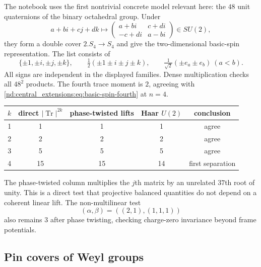 \documentclass[10pt]{article}
\newcommand{\Tr}{\operatorname{Tr}}
\begin{document}
The notebook uses the first nontrivial concrete model relevant here:
the $48$ unit quaternions of the binary octahedral group.  Under
\[
 a+bi+cj+dk\longmapsto
 \begin{pmatrix}a+bi&c+di\\-c+di&a-bi\end{pmatrix}\in SU(2),
\]
they form a double cover $2.S_4\to S_4$ and give the two-dimensional
basic-spin representation.  The list consists of
\[
 \{\pm1,\pm i,\pm j,\pm k\},\qquad
 \tfrac12(\pm1\pm i\pm j\pm k),\qquad
 \tfrac1{\sqrt2}(\pm e_a\pm e_b)\ (a<b).
\]
All signs are independent in the displayed families.  Dense multiplication
checks all $48^2$ products.  The fourth trace moment is $2$, agreeing with
\eqref{nd:central_extensions:eq:basic-spin-fourth} at $n=4$.

\begin{center}
\begin{tabular}{@{}c c c c c@{}}
\toprule
$k$ & direct $|\Tr|^{2k}$ & phase-twisted lifts & Haar $U(2)$ & conclusion\\
\midrule
1 & 1 & 1 & 1 & agree\\
2 & 2 & 2 & 2 & agree\\
3 & 5 & 5 & 5 & agree\\
4 & 15 & 15 & 14 & first separation\\
\bottomrule
\end{tabular}
\end{center}

The phase-twisted column multiplies the $j$th matrix by an unrelated
$37$th root of unity.  This is a direct test that projective balanced
quantities do not depend on a coherent linear lift.  The non-multilinear
test
\[
 (\alpha,\beta)=((2,1),(1,1,1))
\]
also remains $3$ after phase twisting, checking charge-zero invariance beyond
frame potentials.

\subsection{Pin covers of Weyl groups}
\end{document}
